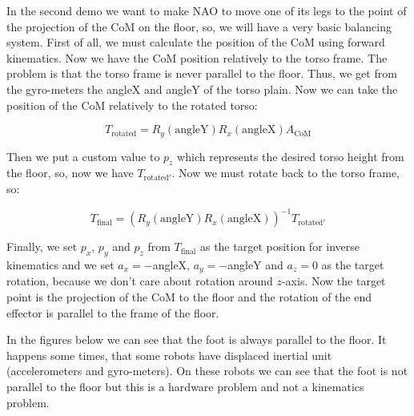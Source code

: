 In the second demo we want to make NAO to move one of its legs to the point of the projection of the CoM on the floor, so, we will have a very basic balancing system. First of all, we must calculate the position of the CoM using forward kinematics. Now we have the CoM position relatively to the torso frame. The problem is that the torso frame is never parallel to the floor. Thus, we get from the gyro-meters the angleX and angleY of the torso plain. Now we can take the position of the CoM relatively to the rotated torso:

\[
	T_{\text{rotated}} = R_y(\text{angleY})R_x(\text{angleX})A_{\text{CoM}}
\]

Then we put a custom value to $p_z$ which represents the desired torso height from the floor, so, now we have $T_{\text{rotated}'}$. Now we must rotate back to the torso frame, so:

\[
	T_{\text{final}} = \left(R_y(\text{angleY})R_x(\text{angleX})\right)^{-1}T_{\text{rotated}'}
\]

Finally, we set  $p_x$, $p_y$ and $p_z$ from $T_{\text{final}}$ as the target position for inverse kinematics and we set $a_x = -$angleX, $a_y = -$angleY and $a_z = 0$ as the target rotation, because we don't care about rotation around $z$-axis. Now the target point is the projection of the CoM to the floor and the rotation of the end effector is parallel to the frame of the floor.

In the figures below we can see that the foot is always parallel to the floor. It happens some times, that some robots have displaced inertial unit (accelerometers and gyro-meters). On these robots we can see that the foot is not parallel to the floor but this is a hardware problem and not a kinematics problem.

